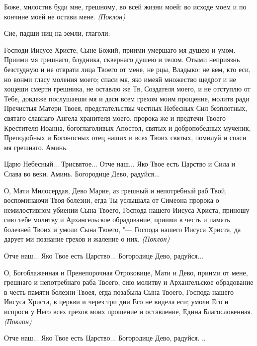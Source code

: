 \normalfont{}Боже, милостив буди мне, грешному, во всей жизни моей: во исходе моем и по кончине моей не остави мене. \itshape (Поклон)

Сие, падши ниц на земли, глаголи:

\normalfont{}Господи Иисусе Христе, Сыне Божий, приими умершаго мя душею и умом. Приими мя грешнаго, блудника, сквернаго душею и телом. Отыми неприязнь безстудную и не отврати лица Твоего от мене, не рцы, Владыко: не вем, кто еси, но вонми гласу моления моего; спаси мя, яко имеяй множество щедрот и не хощеши смерти грешника, не оставлю же Тя, Создателя моего, и не отступлю от Тебе, довдеже послушаеши мя и даси всем грехом моим прощение, молитв ради Пречистыя Матери Твоея, предстательствы честных Небесных Сил безплотных, святаго славнаго Ангела хранителя моего, пророка же и предтечи Твоего Крестителя Иоанна, богоглаголивых Апостол, святых и добропобедных мученик, Преподобных и Богоносных отец наших и всех Твоих святых, помилуй и спаси мя грешнаго. Аминь.

Царю Небесный... Трисвятое... Отче наш... Яко Твое есть Царство и Сила и Слава во веки. Аминь. Богородице Дево, радуйся...






О, Мати Милосердая, Дево Марие, аз грешный и непотребный раб Твой, воспоминаючи Твоя болезни, егда Ты услышала от Симеона пророка о немилостивном убиении Сына Твоего, Господа нашего Иисуса Христа, приношу сию тебе молитву и Архангельское обрадование, приими в честь и память болезней Твоих и умоли Сына Твоего, "--- Господа нашего Иисуса Христа, да дарует ми познание грехов и жаление о них. \itshape (Поклон)\normalfont{}




Отче наш... Яко Твое есть Царство... Богородице Дево, радуйся...

О, Богоблаженная и Пренепорочная Отроковице, Мати и Дево, приими от мене, грешнаго и непотребнаго раба Твоего, сию молитву и Архангельское обрадование в честь памяти болезни Твоея, егда позабыла Сына Твоего, Господа нашего Иисуса Христа, в церкви и через три дни Его не видела еси; умоли Его и испроси у Него всех грехов моих прощение и оставление, Едина Благословенная. \itshape (Поклон)\normalfont{}




Отче наш... Яко Твое есть Царство... Богородице Дево, радуйся. ..


